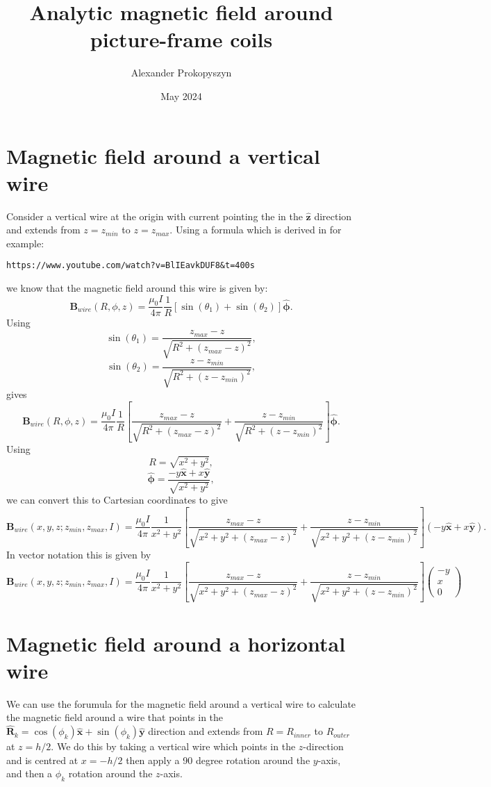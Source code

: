 \documentclass{article}
\title{Analytic magnetic field around picture-frame coils}
\author{Alexander Prokopyszyn}
\date{May 2024}
\begin{document}
\maketitle

\section{Magnetic field around a vertical wire}

Consider a vertical wire at the origin with current pointing the in the $\mathbf{\hat{z}}$ direction and extends from $z=z_{min}$ to $z=z_{max}$. Using a formula which is derived in for example:
\begin{verbatim}
https://www.youtube.com/watch?v=BlIEavkDUF8&t=400s
\end{verbatim}
we know that the magnetic field around this wire is given by:
\[\mathbf{B}_{wire}(R, \phi, z) = \frac{\mu_0I}{4\pi}\frac{1}{R} \left[\sin(\theta_1) + \sin(\theta_2)\right]\mathbf{\hat{\phi}}.\]
Using
\[\sin(\theta_1) = \frac{z_{max}-z}{\sqrt{R^2+(z_{max}-z)^2}},\]
\[\sin(\theta_2) = \frac{z-z_{min}}{\sqrt{R^2+(z-z_{min})^2}},\]
gives
\[\mathbf{B}_{wire}(R, \phi, z) = \frac{\mu_0I}{4\pi}\frac{1}{R} \left[\frac{z_{max}-z}{\sqrt{R^2+(z_{max}-z)^2}} + \frac{z-z_{min}}{\sqrt{R^2+(z-z_{min})^2}}\right]\mathbf{\hat{\phi}}.\]
Using
\[R = \sqrt{x^2+y^2},\]
\[\mathbf{\hat{\phi}}=\frac{-y\mathbf{\hat{x}}+x\mathbf{\hat{y}}}{\sqrt{x^2+y^2}},\]
we can convert this to Cartesian coordinates to give
\[\mathbf{B}_{wire}(x, y, z; z_{min}, z_{max}, I) = \frac{\mu_0I}{4\pi}\frac{1}{x^2+y^2} \left[\frac{z_{max}-z}{\sqrt{x^2+y^2+(z_{max}-z)^2}} + \frac{z-z_{min}}{\sqrt{x^2+y^2+(z-z_{min})^2}}\right](-y\mathbf{\hat{x}}+x\mathbf{\hat{y}}).\]
In vector notation this is given by
\[\boxed{\mathbf{B}_{wire}(x, y, z; z_{min}, z_{max}, I) = \frac{\mu_0I}{4\pi}\frac{1}{x^2+y^2} \left[\frac{z_{max}-z}{\sqrt{x^2+y^2+(z_{max}-z)^2}} + \frac{z-z_{min}}{\sqrt{x^2+y^2+(z-z_{min})^2}}\right]
\begin{pmatrix}
    -y \\ x \\ 0
\end{pmatrix}}\]

\section{Magnetic field around a horizontal wire}

We can use the forumula for the magnetic field around a vertical wire to calculate the
 magnetic field around a wire that points
in the $\mathbf{\hat{R}}_k = \cos(\phi_k)\mathbf{\hat{x}}+\sin(\phi_k)\mathbf{\hat{y}}$ direction
 and extends from $R=R_{inner}$ to $R_{outer}$ at $z=h/2$.
 We do this by taking a vertical wire which points in the $z$-direction
 and is centred at $x=-h/2$ then apply a 90 degree rotation around the $y$-axis,
  and then a $\phi_k$ rotation around the $z$-axis.
\end{document}
